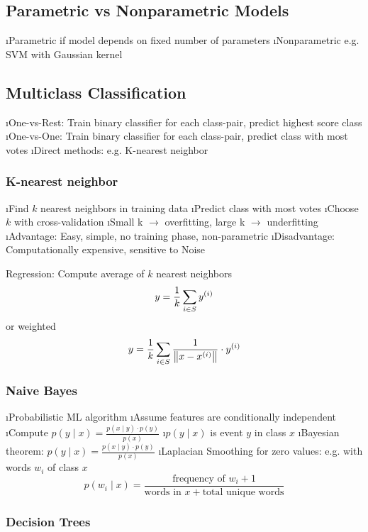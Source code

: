 \subsection{Parametric vs Nonparametric Models}

\bi
\i Parametric if model depends on fixed number of parameters
\i Nonparametric e.g. SVM with Gaussian kernel
\ei

\subsection{Multiclass Classification}

\bi
\i One-vs-Rest: Train binary classifier for each class-pair, predict highest score class
\i One-vs-One: Train binary classifier for each class-pair, predict class with most votes
\i Direct methods: e.g. K-nearest neighbor 
\ei 

\subsubsection{K-nearest neighbor}

\bi
\i Find $k$ nearest neighbors in training data
\i Predict class with most votes
\i Choose $k$ with cross-validation
\i Small k $\to$ overfitting, large k $\to$ underfitting
\i Advantage: Easy, simple, no training phase, non-parametric
\i Disadvantage: Computationally expensive, sensitive to Noise
\ei

Regression: Compute average of $k$ nearest neighbors \[y = \frac{1}{k} \displaystyle\sum_{i \in S} y^{(i)}\] or weighted \[y = \frac{1}{k} \displaystyle\sum_{i \in S} \frac{1}{\left\lVert x-x^{(i)}\right\rVert} \cdot y^{(i)}\]

\subsubsection{Naive Bayes}

\bi
\i Probabilistic ML algorithm
\i Assume features are conditionally independent
\i Compute $p(y \mid x) = \frac{p(x \mid y) \cdot p(y)}{p(x)}$
\i $p(y \mid x)$ is event $y$ in class $x$
\i Bayesian theorem: $p(y \mid x) = \frac{p(x \mid y) \cdot p(y)}{p(x)}$
\i Laplacian Smoothing for zero values: e.g. with words $w_i$ of class $x$ \[
p(w_i \mid x) = \frac{\text{frequency of $w_i$} +1 }{\text{words in $x$} + \text{total unique words}}
\]
\ei

\subsubsection{Decision Trees}

